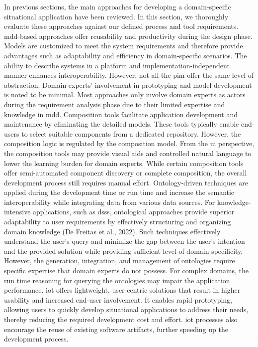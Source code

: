In previous sections, the main approaches for developing a domain-specific situational application have been reviewed. In this section, we thoroughly evaluate these approaches against our defined process and tool requirements.
\gls{mdd}-based approaches offer reusability and productivity during the design phase. Models are customized to meet the system requirements and therefore provide advantages such as adaptability and efficiency in domain-specific scenarios. The ability to describe systems in a platform and implementation-independent manner enhances interoperability. However, not all the \gls{pim} offer the same level of abstraction. Domain experts’ involvement in prototyping and model development is noted to be minimal. Most approaches only involve domain experts as actors during the requirement analysis phase due to their limited expertise and knowledge in \gls{mdd}.
Composition tools facilitate application development and maintenance by eliminating the detailed models. These tools typically enable end-users to select suitable components from a dedicated repository. However, the composition logic is regulated by the composition model. From the \gls{ui} perspective, the composition tools may provide visual aids and controlled natural language to lower the learning burden for domain experts. While certain composition tools offer semi-automated component discovery or complete composition, the overall development process still requires manual effort. 
Ontology-driven techniques are applied during the development time or run time and increase the semantic interoperability while integrating data from various data sources. For knowledge-intensive applications, such as \gls{dss}s, ontological approaches provide superior adaptability to user requirements by effectively structuring and organizing domain knowledge (De Freitas et al., 2022). Such techniques effectively understand the user’s query and minimize the gap between the user’s intention and the provided solution while providing sufficient level of domain specificity. However, the generation, integration, and management of ontologies require specific expertise that domain experts do not possess. For complex domains, the run time reasoning for querying the ontologies may impair the application performance.
\gls{iot} offers lightweight, user-centric solutions that result in higher usability and increased end-user involvement. It enables rapid prototyping, allowing users to quickly develop situational applications to address their needs, thereby reducing the required development cost and effort. \gls{iot} processes also encourage the reuse of existing software artifacts, further speeding up the development process.



